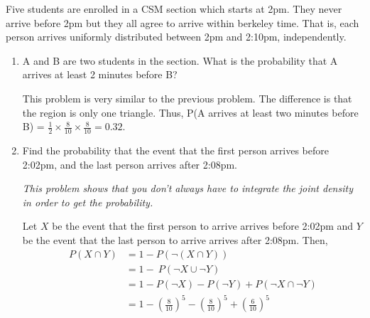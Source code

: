 \question Five students are enrolled in a CSM section which starts at 2pm. They never arrive before 2pm but they all agree to arrive within berkeley time. That is, each person arrives uniformly distributed between 2pm and 2:10pm, independently. 

\begin{enumerate}[label=(\alph*)] 
\item A and B are two students in the section. What is the probability that A arrives at least 2 minutes before B? 
\begin{solution}[.5cm] 
This problem is very similar to the previous problem. The difference is that the region is only one triangle. Thus, P(A arrives at least two minutes before B) = $\frac{1}{2} \times \frac{8}{10} \times \frac{8}{10} = 0.32$. 
\end{solution}

\item Find the probability that the event that the first person arrives before 2:02pm, and the last person arrives after 2:08pm. 
\begin{solution}[.75cm] 
\textit{This problem shows that you don't always have to integrate the joint density in order to get the probability.} 

Let $X$ be the event that the first person to arrive arrives before 2:02pm and $Y$ be the event that the last person to arrive arrives after 2:08pm. Then, 
\begin{align*}
    P(X \cap Y) &= 1 - P(\neg (X \cap Y)) \\
                &= 1 - \ P(\neg X \cup \neg Y) \\
                &= 1 - P(\neg X) - P(\neg Y) + P(\neg X \cap \neg Y) \\
                &= 1 - (\frac{8}{10})^5 - (\frac{8}{10})^5+ ({\frac{6}{10}})^5
\end{align*}

\end{solution}
\end{enumerate}
